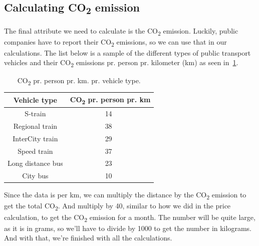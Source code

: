 \subsection{Calculating \unit{CO_{2}} emission}\label{subsec:calculating-co2-emission}

The final attribute we need to calculate is the \unit{CO_{2}} emission.
Luckily, public companies have to report their \unit{CO_{2}} emissions, so we can use that in our calculations.
The list below is a sample of the different types of public transport vehicles and their \unit{CO_{2}} emissions pr.
person pr. kilometer (km) as seen in~\ref{tab:emissions}.

\begin{table}
    \centering
    \begin{tabular}{ || c | c || }
        \hline
        Vehicle type & \unit{CO_{2}} pr. person pr. km \\
        \hline\hline
        S-train & 14~\cite{dsb2023} \\
        \hline
        Regional train & 38~\cite{dsb2023} \\
        \hline
        InterCity train & 29~\cite{dsb2023} \\
        \hline
        Speed train & 37~\cite{dsb2023} \\
        \hline
        Long distance bus & 23~\cite{cowi2022} \\
        \hline
        City bus & 10~\cite{ntm2023} \\
        \hline
    \end{tabular}
    \caption{\unit{CO_{2}} pr. person pr. km. pr. vehicle type.}
    \label{tab:emissions}
\end{table}

Since the data is per km, we can multiply the distance by the \unit{CO_{2}} emission to get the total \unit{CO_{2}}.
And multiply by 40, similar to how we did in the price calculation, to get the \unit{CO_{2}} emission for a month.
The number will be quite large, as it is in grams, so we'll have to divide by 1000 to get the number in kilograms.
And with that, we're finished with all the calculations.

